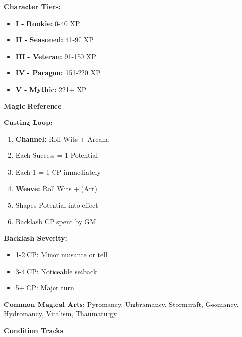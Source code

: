 \documentclass[10pt]{article}
\begin{document}
\begin{mdframed}[backgroundcolor=background, linewidth=0pt, roundcorner=5pt]
\begin{adjustwidth}{0.2cm}{0.2cm}
\textbf{Character Tiers:}
\begin{itemize}[leftmargin=*]
\item \textbf{I - Rookie:} 0-40 XP
\item \textbf{II - Seasoned:} 41-90 XP
\item \textbf{III - Veteran:} 91-150 XP
\item \textbf{IV - Paragon:} 151-220 XP
\item \textbf{V - Mythic:} 221+ XP
\end{itemize}
\end{adjustwidth}

\vspace{0.3cm}

\begin{mdframed}[backgroundcolor=sectionbg, linewidth=1pt, linecolor=accentcolor, roundcorner=3pt]
\textbf{\large Magic Reference}
\end{mdframed}

\begin{adjustwidth}{0.2cm}{0.2cm}
\vspace{0.2cm}
\textbf{Casting Loop:}
\begin{enumerate}[leftmargin=*]
\item \textbf{Channel:} Roll Wits + Arcana
\item Each Success = 1 Potential
\item Each 1 = 1 CP immediately
\item \textbf{Weave:} Roll Wits + (Art)
\item Shapes Potential into effect
\item Backlash CP spent by GM
\end{enumerate}

\textbf{Backlash Severity:}
\begin{itemize}[leftmargin=*]
\item 1-2 CP: Minor nuisance or tell
\item 3-4 CP: Noticeable setback
\item 5+ CP: Major turn
\end{itemize}

\textbf{Common Magical Arts:}
Pyromancy, Umbramancy, Stormcraft, Geomancy, Hydromancy, Vitalism, Thaumaturgy
\end{adjustwidth}

\vspace{0.3cm}

\begin{mdframed}[backgroundcolor=sectionbg, linewidth=1pt, linecolor=accentcolor, roundcorner=3pt]
\textbf{\large Condition Tracks}
\end{mdframed}


\end{mdframed}
\end{document}
